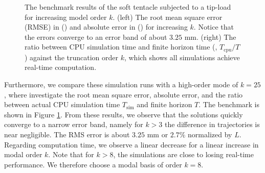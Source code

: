 \begin{example}
\begin{figure}[!t]
  \caption{\small The benchmark results of the soft tentacle subjected to a tip-load for increasing model order $k$. (left) The root mean square error (RMSE) in () and absolute error in () for increasing $k$. Notice that the errors converge to an error band of about $3.25$ \si{\milli \meter}. (right) The ratio between CPU simulation time and finite horizon time (\ie, $T_{\textrm{cpu}}/T$) against the truncation order $k$, which shows all simulations achieve real-time computation. }
  \label{fig:C3:EX2:mode_convergence_bench}
  \end{figure}
 
 Furthermore, we compare these simulation runs with a high-order mode of $k = 25$, where investigate the root mean square error, absolute error, and the ratio between actual CPU simulation time $T_{\textrm{sim}}$ and finite horizon $T$. The benchmark is shown in Figure \ref{fig:C3:EX2:mode_convergence_bench}. From these results, we observe that the solutions quickly converge to a narrow error band, namely for $k>3$ the difference in trajectories is near negligible. The RMS error is about $3.25$ \si{\milli \meter} or $2.7\%$ normalized by $L$.  Regarding computation time, we observe a linear decrease for a linear increase in modal order $k$. Note that for $k > 8$, the simulations are close to losing real-time performance. We therefore choose a modal basis of order $k = 8$. 
\end{example}

